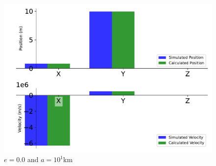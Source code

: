 \begin{figure}[htbp]\centerline{\includegraphics[height=0.7\textwidth, keepaspectratio]{AutoTeX/EquCirc_2}}\caption{$e = 0.0$ and $a = 10^1$km}\label{fig:EquCirc_2}\end{figure}